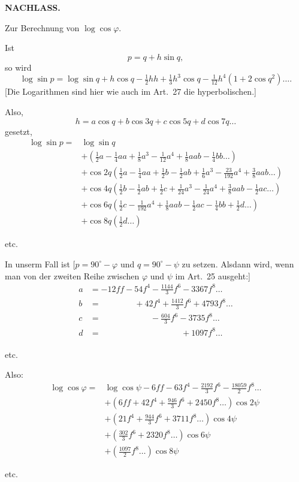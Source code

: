 \par\clearpage
{}\hfill{\small\textbf{NACHLASS.}}\hfill\null\par\medskip
{\centering [26.]\par\medskip Zur Berechnung von \(\log\cos\varphi\).\par}
Ist
\[p=q+h\sin q,\]
\noindent so wird
\[\log\sin p=\log\sin q+h\cos q-\tfrac12hh+\tfrac13h^3\cos q-\tfrac1{12}h^4(1+2\cos q^2)\ldots.\]
[Die Logarithmen sind hier wie auch im Art.~27 die hyperbolischen.]

Also,
\[h=a\cos q+b\cos3q+c\cos5q+d\cos7q\ldots\]
\noindent gesetzt,
\[
\begin{aligned}
\log\sin p={}&\log\sin q\\
&+(\tfrac12a-\tfrac14aa+\tfrac18a^3-\tfrac1{12}a^4+\tfrac18aab-\tfrac14bb\ldots)\\
&+\cos2q(\tfrac12a-\tfrac14aa+\tfrac12b-\tfrac12ab+\tfrac16a^3-\tfrac{23}{192}a^4+\tfrac38aab\ldots)\\
&+\cos4q(\tfrac12b-\tfrac12ab+\tfrac12c+\tfrac1{24}a^3-\tfrac1{24}a^4+\tfrac38aab-\tfrac12ac\ldots)\\
&+\cos6q(\tfrac12c-\tfrac1{192}a^4+\tfrac18aab-\tfrac12ac-\tfrac14bb+\tfrac12d\ldots)\\
&+\cos8q(\tfrac12d\ldots)
\end{aligned}
\]
{\centering etc.\par}
In unserm Fall ist [\(p=90^\circ-\varphi\) und \(q=90^\circ-\psi\) zu setzen. Alsdann wird, wenn man von der zweiten Reihe zwischen \(\varphi\) und \(\psi\) im Art.~25 ausgeht:]
\[
\begin{aligned}
a&=-12ff-54f^4-\frac{1144}{3}f^6-3367f^8\ldots\\
b&=\phantom{-12ff-}+42f^4+\frac{1412}{3}f^6+4793f^8\ldots\\
c&=\phantom{-12ff-54f^4}-\frac{604}{3}f^6-3735f^8\ldots\\
d&=\phantom{-12ff-54f^4-\frac{1144}{3}f^6}+1097f^8\ldots
\end{aligned}
\]
{\centering etc.\par}
Also:
\[
\begin{aligned}
\log\cos\varphi={}&\log\cos\psi-6ff-63f^4-\tfrac{2192}{3}f^6-\tfrac{18059}{2}f^8\ldots\\
&+(6ff+42f^4+\tfrac{946}{3}f^6+2450f^8\ldots)\cos2\psi\\
&+(21f^4+\tfrac{944}{3}f^6+3711f^8\ldots)\cos4\psi\\
&+(\tfrac{302}{3}f^6+2320f^8\ldots)\cos6\psi\\
&+(\tfrac{1097}{2}f^8\ldots)\cos8\psi
\end{aligned}
\]
{\centering etc.\par}

